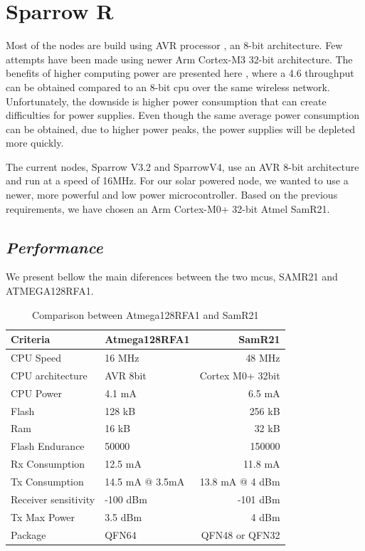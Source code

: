 \normalfont\normalsize
\chapter{Sparrow R}

Most of the nodes are build using AVR processor \cite{nodelist}, an 8-bit architecture. Few attempts have been made
using newer Arm Cortex-M3 32-bit architecture. The benefits of higher computing power are presented here
\cite{jurdak2011opal}, where a 4.6 throughput can be obtained compared to an 8-bit cpu over the
same wireless network. Unfortunately, the downside is higher power consumption that can create
difficulties for power supplies. Even though the same average power consumption can be obtained, due
to higher power peaks, the power supplies will be depleted more quickly.

The current nodes, Sparrow V3.2 and SparrowV4, use an AVR 8-bit architecture and run at a speed of
16MHz. For our solar powered node, we wanted to use a newer, more powerful and low power
microcontroller. Based on the previous requirements, we have chosen an Arm Cortex-M0+ 32-bit Atmel SamR21.


\section{\textit{Performance}}

We present bellow the main diferences between the two mcus, SAMR21 and ATMEGA128RFA1\cite{atmegafa}.

\begin{table} \centering
\begin{tabular}{llr}
\hline
Criteria    & Atmega128RFA1 & SamR21 \\
\hline
CPU Speed      & 16 MHz    & 48 MHz      \\
CPU architecture      & AVR 8bit    & Cortex M0+ 32bit      \\
CPU Power          & 4.1 mA       & 6.5 mA       \\
Flash           & 128 kB        & 256 kB        \\
Ram                 & 16 kB     & 32 kB         \\
Flash Endurance     &  50000    & 150000        \\
Rx Consumption       & 12.5 mA     & 11.8 mA     \\
Tx Consumption       & 14.5 mA @ 3.5mA     & 13.8 mA @ 4 dBm      \\
Receiver sensitivity & -100 dBm      & -101 dBm       \\
Tx Max Power & 3.5 dBm      & 4 dBm       \\
Package & QFN64      & QFN48 or QFN32      \\
\hline
\end{tabular}
\caption{Comparison between Atmega128RFA1 and SamR21}
\end{table}

